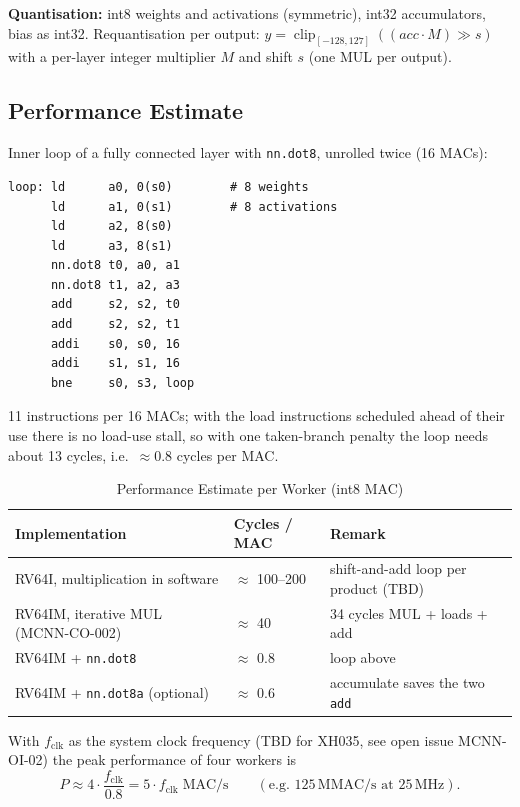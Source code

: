 \textbf{Quantisation:} int8 weights and activations (symmetric), int32
accumulators, bias as int32. Requantisation per output:
$y = \operatorname{clip}_{[-128,127]}\!\left((acc \cdot M) \gg s\right)$
with a per-layer integer multiplier $M$ and shift $s$ (one MUL per output).

\subsection{Performance Estimate}
\label{subsec:mcnnperf}

Inner loop of a fully connected layer with \texttt{nn.dot8}, unrolled
twice (16 MACs):

\begin{lstlisting}[basicstyle=\ttfamily\footnotesize, frame=single]
loop: ld      a0, 0(s0)        # 8 weights
      ld      a1, 0(s1)        # 8 activations
      ld      a2, 8(s0)
      ld      a3, 8(s1)
      nn.dot8 t0, a0, a1
      nn.dot8 t1, a2, a3
      add     s2, s2, t0
      add     s2, s2, t1
      addi    s0, s0, 16
      addi    s1, s1, 16
      bne     s0, s3, loop
\end{lstlisting}

11 instructions per 16 MACs; with the load instructions scheduled ahead of
their use there is no load-use stall, so with one taken-branch penalty the
loop needs about 13 cycles, i.e.\ $\approx$0.8 cycles per MAC.

\begin{table}[H]
\caption{Performance Estimate per Worker (int8 MAC)}
\label{tab:mcnnperf}
\centering
{\footnotesize
\begin{tabularx}{\textwidth}{|l |l |X|}
  \hline
  Implementation & Cycles / MAC & Remark \\
  \hline
  \hline
  RV64I, multiplication in software & $\approx$ 100--200 & shift-and-add loop per product (TBD) \\
  \hline
  RV64IM, iterative MUL (MCNN-CO-002) & $\approx$ 40 & 34 cycles MUL + loads + add \\
  \hline
  RV64IM + \texttt{nn.dot8} & $\approx$ 0.8 & loop above \\
  \hline
  RV64IM + \texttt{nn.dot8a} (optional) & $\approx$ 0.6 & accumulate saves the two \texttt{add} \\
  \hline
\end{tabularx}}
\end{table}

With $f_\text{clk}$ as the system clock frequency (TBD for XH035, see
open issue MCNN-OI-02) the peak performance of four workers is
\[
  P \approx 4 \cdot \frac{f_\text{clk}}{0.8} = 5 \cdot f_\text{clk}
  \;\text{MAC/s}
  \qquad (\text{e.g. } 125\,\text{MMAC/s at } 25\,\text{MHz}).
\]

